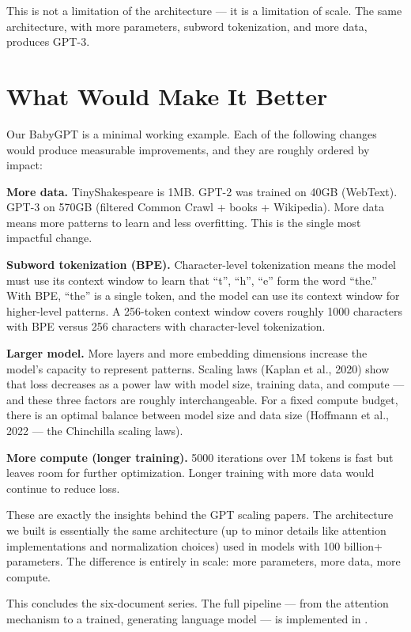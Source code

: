 This is not a limitation of the architecture --- it is a limitation of scale. The same architecture, with more parameters, subword tokenization, and more data, produces GPT-3.

\section{What Would Make It Better}

Our BabyGPT is a minimal working example. Each of the following changes would produce measurable improvements, and they are roughly ordered by impact:

\textbf{More data.} TinyShakespeare is 1MB. GPT-2 was trained on 40GB (WebText). GPT-3 on 570GB (filtered Common Crawl + books + Wikipedia). More data means more patterns to learn and less overfitting. This is the single most impactful change.

\textbf{Subword tokenization (BPE).} Character-level tokenization means the model must use its context window to learn that ``t'', ``h'', ``e'' form the word ``the.'' With BPE, ``the'' is a single token, and the model can use its context window for higher-level patterns. A 256-token context window covers roughly 1000 characters with BPE versus 256 characters with character-level tokenization.

\textbf{Larger model.} More layers and more embedding dimensions increase the model's capacity to represent patterns. Scaling laws (Kaplan et al., 2020) show that loss decreases as a power law with model size, training data, and compute --- and these three factors are roughly interchangeable. For a fixed compute budget, there is an optimal balance between model size and data size (Hoffmann et al., 2022 --- the Chinchilla scaling laws).

\textbf{More compute (longer training).} 5000 iterations over 1M tokens is fast but leaves room for further optimization. Longer training with more data would continue to reduce loss.

These are exactly the insights behind the GPT scaling papers. The architecture we built is essentially the same architecture (up to minor details like attention implementations and normalization choices) used in models with 100 billion+ parameters. The difference is entirely in scale: more parameters, more data, more compute.

\bigskip

This concludes the six-document series. The full pipeline --- from the attention mechanism to a trained, generating language model --- is implemented in .

